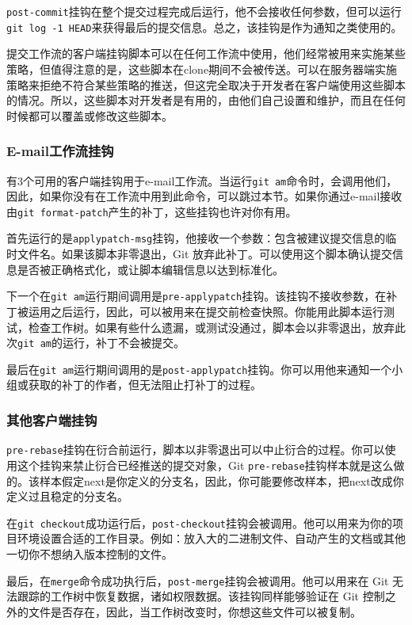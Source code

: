 \documentclass[a4paper]{book}
\begin{document}
\texttt{post-commit}挂钩在整个提交过程完成后运行，他不会接收任何参数，但可以运行\texttt{git log -1 HEAD}来获得最后的提交信息。总之，该挂钩是作为通知之类使用的。

提交工作流的客户端挂钩脚本可以在任何工作流中使用，他们经常被用来实施某些策略，但值得注意的是，这些脚本在clone期间不会被传送。可以在服务器端实施策略来拒绝不符合某些策略的推送，但这完全取决于开发者在客户端使用这些脚本的情况。所以，这些脚本对开发者是有用的，由他们自己设置和维护，而且在任何时候都可以覆盖或修改这些脚本。

\subsubsection{E-mail工作流挂钩}

有3个可用的客户端挂钩用于e-mail工作流。当运行\texttt{git am}命令时，会调用他们，因此，如果你没有在工作流中用到此命令，可以跳过本节。如果你通过e-mail接收由\texttt{git format-patch}产生的补丁，这些挂钩也许对你有用。

首先运行的是\texttt{applypatch-msg}挂钩，他接收一个参数：包含被建议提交信息的临时文件名。如果该脚本非零退出，Git 放弃此补丁。可以使用这个脚本确认提交信息是否被正确格式化，或让脚本编辑信息以达到标准化。

下一个在\texttt{git am}运行期间调用是\texttt{pre-applypatch}挂钩。该挂钩不接收参数，在补丁被运用之后运行，因此，可以被用来在提交前检查快照。你能用此脚本运行测试，检查工作树。如果有些什么遗漏，或测试没通过，脚本会以非零退出，放弃此次\texttt{git am}的运行，补丁不会被提交。

最后在\texttt{git am}运行期间调用的是\texttt{post-applypatch}挂钩。你可以用他来通知一个小组或获取的补丁的作者，但无法阻止打补丁的过程。

\subsubsection{其他客户端挂钩}

\texttt{pre-rebase}挂钩在衍合前运行，脚本以非零退出可以中止衍合的过程。你可以使用这个挂钩来禁止衍合已经推送的提交对象，Git \texttt{pre-rebase}挂钩样本就是这么做的。该样本假定next是你定义的分支名，因此，你可能要修改样本，把next改成你定义过且稳定的分支名。

在\texttt{git checkout}成功运行后，\texttt{post-checkout}挂钩会被调用。他可以用来为你的项目环境设置合适的工作目录。例如：放入大的二进制文件、自动产生的文档或其他一切你不想纳入版本控制的文件。

最后，在\texttt{merge}命令成功执行后，\texttt{post-merge}挂钩会被调用。他可以用来在 Git 无法跟踪的工作树中恢复数据，诸如权限数据。该挂钩同样能够验证在 Git 控制之外的文件是否存在，因此，当工作树改变时，你想这些文件可以被复制。
\end{document}
